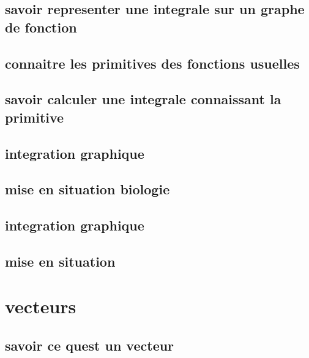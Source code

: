 \documentclass[11pt]{article}
\begin{document}
    \subsection{savoir representer une integrale sur un graphe de fonction}
      
    \subsection{connaitre les primitives des fonctions usuelles}
      
    \subsection{savoir calculer une integrale connaissant la primitive}
      
      
    \subsection{integration graphique}
      
      
    \subsection{mise en situation  biologie}
      
    \subsection{integration graphique}
      
      
    \subsection{mise en situation}
      
  \section{vecteurs}
    \subsection{savoir ce quest un vecteur}
      
      
\end{document}
